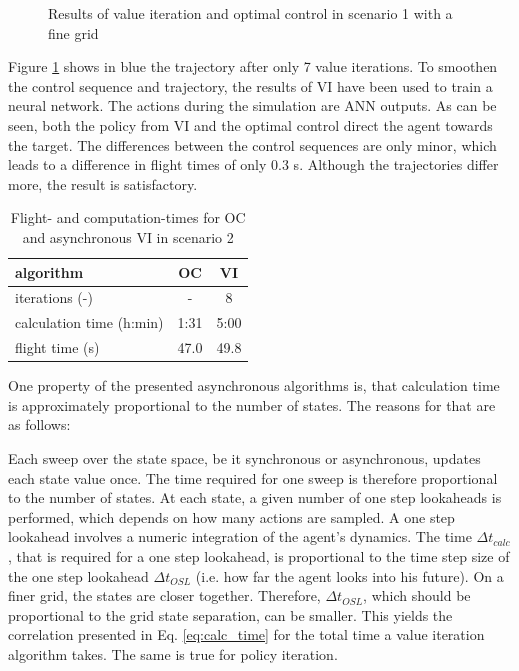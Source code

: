 \begin{figure}[hbt]
	\caption{Results of value iteration and optimal control in scenario 1 with a fine grid}
	\label{tikz:vi500m}
\end{figure}

Figure \ref{tikz:vi500m} shows in blue the trajectory after only 7 value iterations. To smoothen the control sequence and trajectory, the results of VI have been used to train a neural network. The actions during the simulation are ANN outputs. As can be seen, both the policy from VI and the optimal control direct the agent towards the target. The differences between the control sequences are only minor, which leads to a difference in flight times of only 0.3 s. Although the trajectories differ more, the result is satisfactory.

\begin{table}[htb]
	\begin{center}
		\begin{tabular}{l|c c}
			algorithm & OC & VI \\ \hline 
			iterations (-) & - & 8 \\
			calculation time (h:min) & 1:31 & 5:00 \\
			flight time (s) & 47.0 & 49.8
		\end{tabular}
		\caption{Flight- and computation-times for OC and asynchronous VI in scenario 2}
		\label{tab:2d_flight_data_1000m}
	\end{center}
\end{table}
\FloatBarrier

One property of the presented asynchronous algorithms is, that calculation time is approximately proportional to the number of states. The reasons for that are as follows: 

Each sweep over the state space, be it synchronous or asynchronous, updates each state value once. The time required for one sweep is therefore proportional to the number of states. At each state, a given number of one step lookaheads is performed, which depends on how many actions are sampled. A one step lookahead involves a numeric integration of the agent's dynamics. The time $\Delta t_{calc}$, that is required for a one step lookahead, is proportional to the time step size of the one step lookahead $\Delta t_{OSL}$ (i.e. how far the agent looks into his future). On a finer grid, the states are closer together. Therefore, $\Delta t_{OSL}$, which should be proportional to the grid state separation, can be smaller. This yields the correlation presented in Eq. \ref{eq:calc_time} for the total time a value iteration algorithm takes. The same is true for policy iteration.


